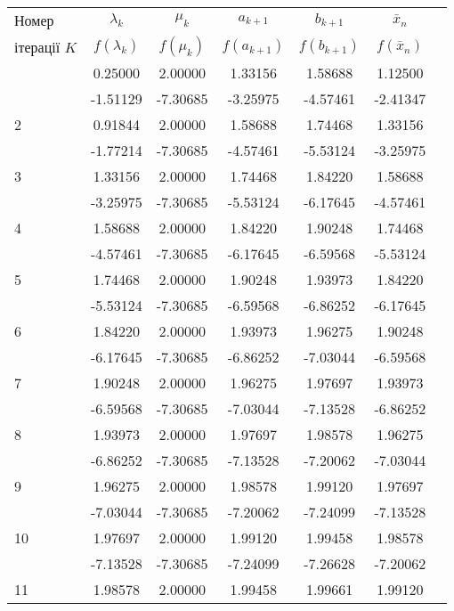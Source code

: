 \documentclass[14pt,a4paper]{extarticle}
\theoremstyle{definition}
\begin{document}
\begin{center}
\begin{longtable}{| l |*6{ c |}}\hline
Номер &$\lambda_k$&$\mu_k$&$a_{k+1}$&$b_{k+1}$&$\bar{x}_n$\\
ітерації $K$&$f(\lambda_k)$&$f(\mu_k)$&$f(a_{k+1})$&$f(b_{k+1})$&$f(\bar{x}_n)$\\\hline
\endfirsthead
\endlastfoot
  1 &  0.25000 &  2.00000 &  1.33156 &  1.58688 &  1.12500 \\*
    & -1.51129 & -7.30685 & -3.25975 & -4.57461 & -2.41347 \\\hline
  2 &  0.91844 &  2.00000 &  1.58688 &  1.74468 &  1.33156 \\*
    & -1.77214 & -7.30685 & -4.57461 & -5.53124 & -3.25975 \\\hline
  3 &  1.33156 &  2.00000 &  1.74468 &  1.84220 &  1.58688 \\*
    & -3.25975 & -7.30685 & -5.53124 & -6.17645 & -4.57461 \\\hline
  4 &  1.58688 &  2.00000 &  1.84220 &  1.90248 &  1.74468 \\*
    & -4.57461 & -7.30685 & -6.17645 & -6.59568 & -5.53124 \\\hline
  5 &  1.74468 &  2.00000 &  1.90248 &  1.93973 &  1.84220 \\*
    & -5.53124 & -7.30685 & -6.59568 & -6.86252 & -6.17645 \\\hline
  6 &  1.84220 &  2.00000 &  1.93973 &  1.96275 &  1.90248 \\*
    & -6.17645 & -7.30685 & -6.86252 & -7.03044 & -6.59568 \\\hline
  7 &  1.90248 &  2.00000 &  1.96275 &  1.97697 &  1.93973 \\*
    & -6.59568 & -7.30685 & -7.03044 & -7.13528 & -6.86252 \\\hline
  8 &  1.93973 &  2.00000 &  1.97697 &  1.98578 &  1.96275 \\*
    & -6.86252 & -7.30685 & -7.13528 & -7.20062 & -7.03044 \\\hline
  9 &  1.96275 &  2.00000 &  1.98578 &  1.99120 &  1.97697 \\*
    & -7.03044 & -7.30685 & -7.20062 & -7.24099 & -7.13528 \\\hline
 10 &  1.97697 &  2.00000 &  1.99120 &  1.99458 &  1.98578 \\*
    & -7.13528 & -7.30685 & -7.24099 & -7.26628 & -7.20062 \\\hline
 11 &  1.98578 &  2.00000 &  1.99458 &  1.99661 &  1.99120 \\*

\end{longtable}
\end{center}
\end{document}
